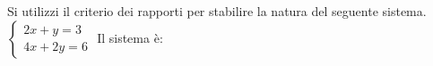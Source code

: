 Si utilizzi il criterio dei rapporti per stabilire la natura del seguente sistema.
$\left\{\begin{matrix}2x+y=3\\4x+2y=6\end{matrix}\right.$ 
Il sistema è: 
